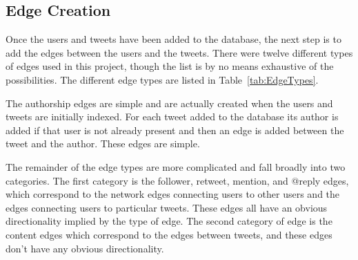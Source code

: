\subsection{Edge Creation}
\label{sec:EdgeCreation}

Once the users and tweets have been added to the database, the next step is to add the edges between the users and the tweets. There were twelve different types of edges used in this project, though the list is by no means exhaustive of the possibilities. The different edge types are listed in Table~\ref{tab:EdgeTypes}. 

The authorship edges are simple and are actually created when the users and tweets are initially indexed. For each tweet added to the database its author is added if that user is not already present and then an edge is added between the tweet and the author. These edges are simple.

The remainder of the edge types are more complicated and fall broadly into two categories. The first category is the follower, retweet, mention, and @reply edges, which correspond to the network edges connecting users to other users and the edges connecting users to particular tweets. These edges all have an obvious directionality implied by the type of edge. The second category of edge is the content edges which correspond to the edges between tweets, and these edges don't have any obvious directionality.


